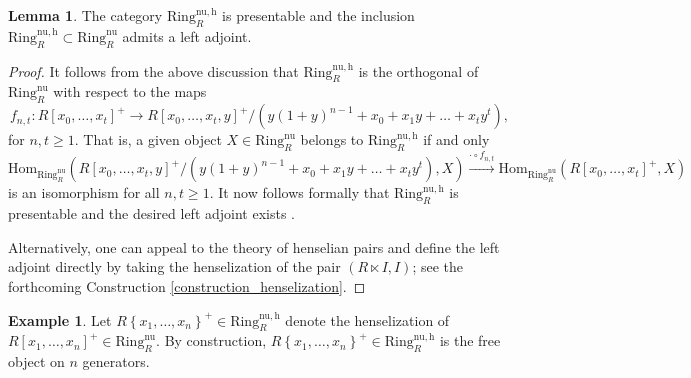 \documentclass{amsart}
\renewcommand{\hom}{\mathrm{Hom}}
\theoremstyle{definition}
\newtheorem{example}[definition]{Example}
\newtheorem{lemma}[definition]{Lemma}
\newcommand{\xto}{\xrightarrow}
\newcommand{\nur}{\mathrm{Ring}^{\mathrm{nu}}_R}
\newcommand{\nuh}{\mathrm{Ring}^{\mathrm{nu,h}}_R}
\begin{document}
\begin{lemma} \label{lemma_nuh}
The category $\nuh$ is presentable and 
the inclusion $\nuh \subset \nur$ admits a left adjoint.
\end{lemma} 
\begin{proof} 
It follows from the above discussion that $\nuh$ is the orthogonal \cite[Sec.~5.4]{Borceux1} of $\nur$
with respect to the maps
\[ f_{n,t}: R[x_0, \dots, x_t]^+  \to 
R[x_0, \dots, x_t, y]^+/( y(1 + y)^{n-1} + x_0 + x_1 y + \dots + x_t y^t ),\]
for $n, t \geq 1$. 
That is, a given object $X \in \nur$ belongs to $\nuh$ if and only
\begin{equation} \label{hommap} 
\hom_{\nur}(
R[x_0, \dots, x_t, y]^+/( y(1 + y)^{n-1} + x_0 + x_1 y + \dots + x_t y^t ), X)
\xto{\cdot\circ f_{n,t}}
\hom_{\nur}(R[x_0, \dots, x_t]^+ , X)
\end{equation}
is an isomorphism for all $n,t\ge1$. It now follows formally that $\nuh$ is presentable and the
desired left adjoint exists \cite[Cor. 5.4.8]{Borceux1}. 

Alternatively, one can appeal to the theory of henselian pairs and define the
left adjoint directly by taking the henselization of the pair $(R \ltimes I, I)$; see the forthcoming Construction \ref{construction_henselization}.
\end{proof}

\begin{example} 
\label{freeobjs}
Let $R\left\{x_1, \dots, x_n\right\}^+\in \nuh$ denote the 
henselization of $R[x_1, \dots, x_n]^+ \in \nur$. 
By construction, $R\left\{x_1, \dots, x_n\right\}^+ \in \nuh$ is the free object on $n$
generators.\end{example} 
\end{document}

